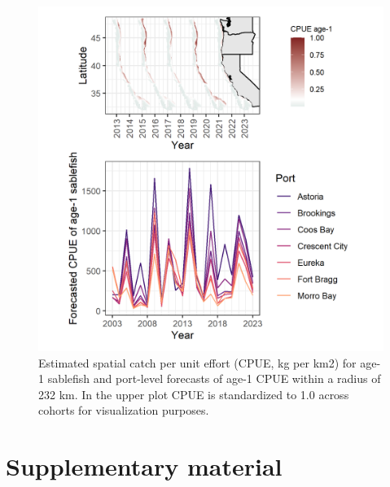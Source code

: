 \documentclass[
]{article}
\begin{document}
\clearpage

\newpage

\begin{figure}

{\centering \includegraphics[width=5in,height=\textheight]{plots/sablefish_spatial_risk.png}

}

\caption{\label{fig-bycatch-risk}Estimated spatial catch per unit effort
(CPUE, kg per km2) for age-1 sablefish and port-level forecasts of age-1
CPUE within a radius of 232 km. In the upper plot CPUE is standardized
to 1.0 across cohorts for visualization purposes.}

\end{figure}

\break
\clearpage

\hypertarget{supplementary-material}{%
\section{Supplementary material}\label{supplementary-material}}
\end{document}
